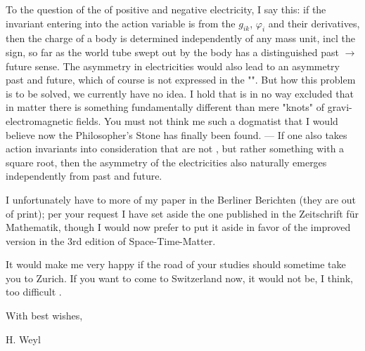 \begin{letter}{1}
To the question of the  of positive and negative electricity, I say this: if the invariant entering into the action variable is  from the $g_{ik}$, $\varphi_i$ and their derivatives, then the charge of a body is determined independently of any mass unit, incl the sign, so far as the world tube swept out by the body has a distinguished past $\to$ future sense. The asymmetry in electricities would also lead to an asymmetry past and future, which of course is not expressed in the "". But how this problem is to be solved, we currently have no idea. I hold that is in no way excluded that in matter there is something fundamentally different than mere "knots" of gravi-electromagnetic fields. You must not think me such a dogmatist that I would believe now the Philosopher's Stone has finally been found. — If one also takes action invariants into consideration that are not , but rather something with a square root, then the asymmetry of the electricities also naturally emerges independently from past and future.

I unfortunately have to more  of my paper in the Berliner Berichten (they are out of print); per your request I have set aside the one published in the Zeitschrift für Mathematik, though I would now prefer to put it aside in favor of the improved version in the 3rd edition of Space-Time-Matter.

It would make me very happy if the road of your studies should sometime take you to Zurich. If you want to come to Switzerland now, it would not be, I think, too difficult .

With best wishes,

H. Weyl

\end{letter}